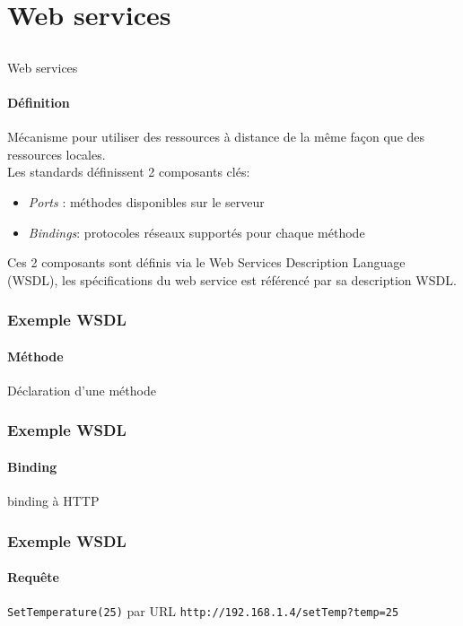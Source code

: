 \section{Web services}
\subsection{}
\begin{frame}{Web services}
\framesubtitle{Définition}
Mécanisme pour utiliser des ressources à distance de la même façon que des ressources locales.\\
Les standards définissent 2 composants clés:
\begin{itemize}
\item \textit{Ports} : méthodes disponibles sur le serveur  
\item \textit{Bindings}: protocoles réseaux supportés pour chaque méthode
\end{itemize}
Ces 2 composants sont définis via le Web Services Description Language (WSDL), les spécifications du web service est référencé par sa description WSDL.
\end{frame}

\begin{frame}
\frametitle{Exemple WSDL}
\framesubtitle{Méthode}
\begin{exampleblock}{Déclaration d'une méthode}

\end{exampleblock}
\end{frame}

\begin{frame}
\frametitle{Exemple WSDL}
\framesubtitle{Binding}
\begin{exampleblock}{binding à HTTP}

\end{exampleblock}
\end{frame}

\begin{frame}
\frametitle{Exemple WSDL}
\framesubtitle{Requête}
\begin{exampleblock}{\texttt{SetTemperature(25)} par URL}
\texttt{http://192.168.1.4/setTemp?temp=25}
\end{exampleblock}
\end{frame}


